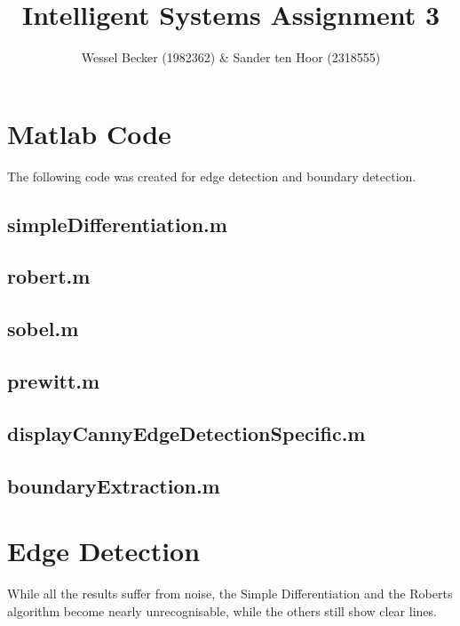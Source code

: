 \documentclass[10pt,a4paper]{article}
\begin{document}
\title{Intelligent Systems Assignment 3}
\author{Wessel Becker (1982362) \& Sander ten Hoor (2318555)}
\maketitle

\section{Matlab Code}
The following code was created for edge detection and boundary detection.

\subsection{simpleDifferentiation.m}


\subsection{robert.m}


\subsection{sobel.m}


\subsection{prewitt.m}


\subsection{displayCannyEdgeDetectionSpecific.m}


\subsection{boundaryExtraction.m}\label{list:boundaryExtraction}


\section{Edge Detection}
While all the results suffer from noise, the Simple Differentiation and the Roberts algorithm become nearly unrecognisable, while the others still show clear lines.
\end{document}
